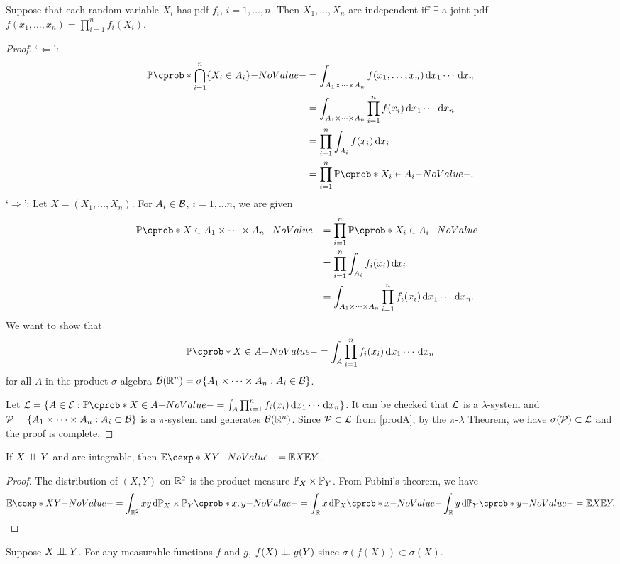 \documentclass[12pt]{article}
\begin{document}
\begin{Lemma} 
Suppose that each random variable $X_i$ has pdf $f_i$, $i=1,\ldots,n$. Then $X_1,\ldots , X_n$ are independent iff $\exists$ a joint pdf $f(x_1,\ldots,x_n)=\prod_{i=1}^n {f_i (X_i)}$.
\end{Lemma}
\begin{proof}
`$\Leftarrow$':
\begin{align*}
\P (\bigcap_{i=1}^n \{X_i \in A_i\}) & = \int_{A_1 \times \cdots \times A_n} f(x_1, \ldots, x_n) \ud x_1 \cdots \ud x_n\\
& = \int_{A_1 \times \cdots \times A_n} \prod_{i=1}^n {f(x_i)} \ud x_1 \cdots \ud x_n\\
& =  \prod_{i=1}^n \int_{A_i} {f(x_i)} \ud x_i\\
& =  \prod_{i=1}^n {\P (X_i \in A_i)}. 
\end{align*}
`$\Rightarrow$':
Let $X=(X_1,\ldots,X_n)$. For $A_i \in \mathcal{B}$, $i=1, \ldots n$, we are given
\begin{align}
\P(X \in A_1\times \cdots \times A_n) & =\prod_{i=1}^n {\P (X_i \in A_i)}\nn
& =  \prod_{i=1}^n \int_{A_i} {f_i(x_i)} \ud x_i\nn
& = \int_{A_1 \times \cdots \times A_n} \prod_{i=1}^n f_i(x_i) \ud x_1\cdots\ud x_n.\label{prodA}
\end{align}
We want to show that 
\begin{align*}
\P(X\in A) = \int_A \prod_{i=1}^n f_i(x_i) \ud x_1\cdots\ud x_n
\end{align*}
for all $A$ in the product $\sigma$-algebra $\mathcal{B}(\mathbb{R}^n)=\sigma \{A_1 \times \cdots \times A_n: A_i \in \mathcal{B}\}$. 

Let $\calL=\{A \in \calE : \P(X\in A)= \int_{A} \prod_{i=1}^n {f_i(x_i)} \ud x_1 \cdots \ud x_n\}$. It can be checked that $\mathcal{L}$ is a $\lambda$-system and $\mathcal{P} = \{ {A_1 \times \cdots \times A_n}: A_i \subset \mathcal{B}\}$ is a $\pi$-system and generates $\mathcal{B}(\mathbb{R}^n)$. Since $\mathcal{P} \subset \mathcal{L}$ from \cref{prodA}, by the $\pi$-$\lambda$ Theorem, we have $\sigma(\mathcal{P}) \subset \mathcal{L}$ and the proof is complete.
\end{proof}

\begin{Lemma}
If $X \independent Y$ and are integrable, then $\E[XY]=\E X \E Y$.
\end{Lemma}
\begin{proof}
The distribution of $(X,Y)$ on $\mathbb{R}^2$ is the product measure $\P_X \times \P_Y$. From Fubini's theorem, we have
\begin{align*}
\E[XY] = \int_{\Real^2} xy \ud \P_X\times\P_Y(x,y) = \int_\Real x \ud\P_X(x) \int_\Real y \ud \P_Y(y) = \E X \E Y.
\end{align*}
\end{proof}

Suppose $X \independent Y$. For any measurable functions $f$ and $g$, $f(X)\independent g(Y)$ since $\sigma(f(X)) \subset \sigma(X)$.



%

\end{document}
